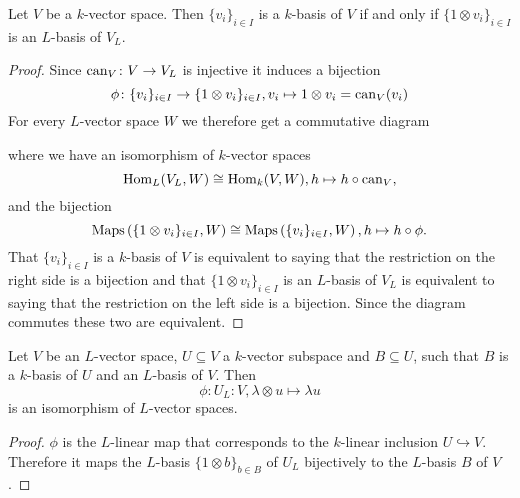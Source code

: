 \begin{lem}
  Let $V$ be a $k$-vector space.
  Then $\{v_i\}_{i \in I}$ is a $k$-basis of $V$ if and only if $\{1 \otimes v_i\}_{i \in I}$ is an $L$-basis of $V_L$.
\end{lem}
\begin{proof}
  Since $\operatorname{can}_V \colon V \to V_L$ is injective it induces a bijection
  \[
            \phi
    \colon  \{v_i\}_{i \in I}
    \to     \{1 \otimes v_i\}_{i \in I},
            v_i
    \mapsto 1 \otimes v_i
    =       \operatorname{can}_V(v_i)
  \]
  For every $L$-vector space $W$ we therefore get a commutative diagram
  \begin{center}
  \end{center}
  where we have an isomorphism of $k$-vector spaces
  \[
            \operatorname{Hom}_L(V_L, W)
    \cong   \operatorname{Hom}_k(V, W),
            h
    \mapsto h \circ \operatorname{can}_V,
  \]
  and the bijection
  \[
          \operatorname{Maps}\left( \{1 \otimes v_i\}_{i \in I}, W \right)
    \cong \operatorname{Maps}\left( \{v_i\}_{i \in I} ,W \right),
            h
    \mapsto h \circ \phi.
  \]
  That $\{v_i\}_{i \in I}$ is a $k$-basis of $V$ is equivalent to saying that the restriction on the right side is a bijection and that $\{1 \otimes v_i\}_{i \in I}$ is an $L$-basis of $V_L$ is equivalent to saying that the restriction on the left side is a bijection.
  Since the diagram commutes these two are equivalent.
\end{proof}


\begin{cor}\label{cor: inclusion to bijection vector spaces}
  Let $V$ be an $L$-vector space, $U \subseteq V$ a $k$-vector subspace and $B \subseteq U$, such that $B$ is a $k$-basis of $U$ and an $L$-basis of $V$.
  Then
  \[
            \phi
    \colon  U_L
    \colon  V,
            \lambda \otimes u
    \mapsto \lambda u
  \]
  is an isomorphism of $L$-vector spaces.
\end{cor}
\begin{proof}
  $\phi$ is the $L$-linear map that corresponds to the $k$-linear inclusion $U \hookrightarrow V$.
  Therefore it maps the $L$-basis $\{1 \otimes b\}_{b \in B}$ of $U_L$ bijectively to the $L$-basis $B$ of $V$.
\end{proof}


